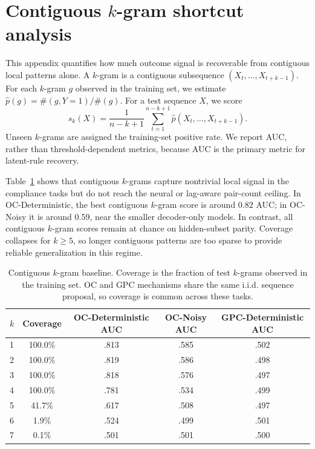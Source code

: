 \documentclass{article}
\theoremstyle{plain}
\theoremstyle{definition}
\theoremstyle{remark}
\begin{document}
\newpage
\section{Contiguous \(k\)-gram shortcut analysis}
\label{appendix:k_gram_analysis}

This appendix quantifies how much outcome signal is recoverable from contiguous
local patterns alone. A \(k\)-gram is a contiguous subsequence
\((X_t,\ldots,X_{t+k-1})\). For each \(k\)-gram \(g\) observed in the training set,
we estimate \(\hat p(g)=\#(g,Y=1)/\#(g)\). For a test sequence \(X\), we score
\[
s_k(X)=\frac{1}{n-k+1}\sum_{t=1}^{n-k+1}
\hat p(X_t,\ldots,X_{t+k-1}).
\]
Unseen \(k\)-grams are assigned the training-set positive rate. We report AUC,
rather than threshold-dependent metrics, because AUC is the primary metric for
latent-rule recovery.

Table~\ref{tab:ngram_appendix} shows that contiguous \(k\)-grams capture
nontrivial local signal in the compliance tasks but do not reach the neural or
lag-aware pair-count ceiling. In OC-Deterministic, the best contiguous
\(k\)-gram score is around \(0.82\) AUC; in OC-Noisy it is around \(0.59\),
near the smaller decoder-only models. In contrast, all contiguous \(k\)-gram
scores remain at chance on hidden-subset parity. Coverage collapses for
\(k\ge5\), so longer contiguous patterns are too sparse to provide reliable
generalization in this regime.

\begin{table}[h]
\centering
\small
\caption{
Contiguous \(k\)-gram baseline. Coverage is the fraction of test \(k\)-grams
observed in the training set. OC and GPC mechanisms share the same i.i.d. sequence
proposal, so coverage is common across these tasks.
}
\label{tab:ngram_appendix}
\begin{tabular}{lcccc}
\toprule
\(k\) & Coverage & OC-Deterministic AUC & OC-Noisy AUC & GPC-Deterministic AUC \\
\midrule
1 & 100.0\% & .813 & .585 & .502 \\
2 & 100.0\% & .819 & .586 & .498 \\
3 & 100.0\% & .818 & .576 & .497 \\
4 & 100.0\% & .781 & .534 & .499 \\
5 & 41.7\%  & .617 & .508 & .497 \\
6 & 1.9\%   & .524 & .499 & .501 \\
7 & 0.1\%   & .501 & .501 & .500 \\
\bottomrule
\end{tabular}
\end{table}
\end{document}
